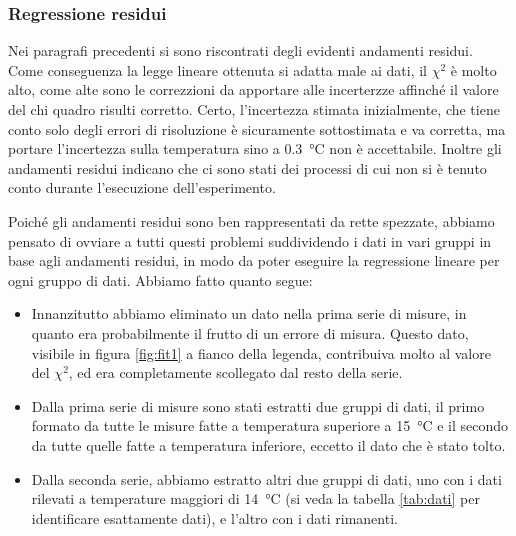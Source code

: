 \subsubsection{Regressione residui}

Nei paragrafi precedenti si sono riscontrati degli evidenti andamenti residui. Come conseguenza la legge lineare ottenuta
si adatta male ai dati, il $\chi^2$ è molto alto, come alte sono le correzzioni da apportare alle incerterzze affinché 
il valore del chi quadro risulti corretto. Certo, l'incertezza stimata inizialmente, che tiene conto solo degli errori di risoluzione
è sicuramente sottostimata e va corretta, ma portare l'incertezza sulla temperatura sino a \SI{0.3}{\celsius} non è accettabile.
Inoltre gli andamenti residui indicano che ci sono stati dei processi di cui non si è tenuto conto durante l'esecuzione dell'esperimento.

Poiché gli andamenti residui sono ben rappresentati da rette spezzate, abbiamo pensato di ovviare a tutti questi problemi suddividendo i
dati in vari gruppi in base agli andamenti residui, in modo da poter eseguire la regressione lineare per ogni gruppo di dati.
Abbiamo fatto quanto segue:

\label{sottoserie}
\begin{itemize}
    \item{Innanzitutto abbiamo eliminato un dato nella prima serie di misure, in quanto era probabilmente il frutto di un
        errore di misura. Questo dato, visibile in figura \ref{fig:fit1} a fianco della legenda,
        contribuiva molto al valore del $\chi^2$, ed era completamente scollegato dal resto della serie.}
    \item{Dalla prima serie di misure sono stati estratti due gruppi di dati, il primo formato da tutte le misure fatte
        a temperatura superiore a \SI{15}{\celsius} e il secondo da tutte quelle fatte a temperatura inferiore, eccetto
        il dato che è stato tolto.}
    \item{Dalla seconda serie, abbiamo estratto altri due gruppi di dati, uno con i dati rilevati a temperature maggiori di
        \SI{14}{\celsius} (si veda la tabella \ref{tab:dati} per identificare esattamente dati), e l'altro con i dati rimanenti.}
\end{itemize}


